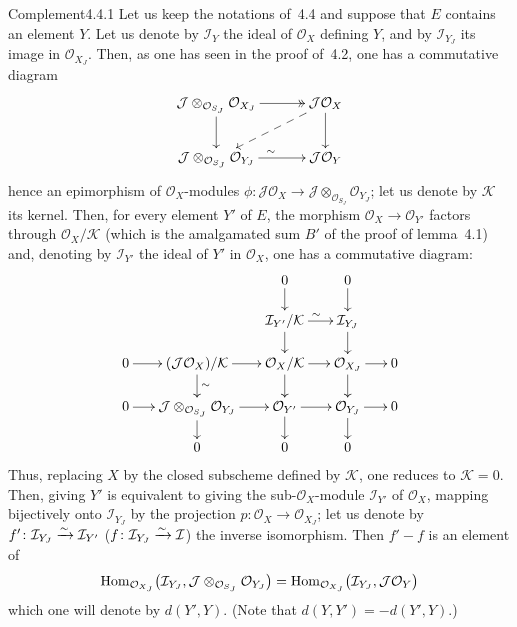\begin{enoncerm}{Complement}{4.4.1}\label{III.4.4.1}
{\renewcommand{\thefootnote}{(80)}}%
Let us keep the notations of~4.4 and suppose that \(E\) contains an element
\(Y\). Let us denote by \(\mathcal{I}_{Y}\) the ideal of \(\mathcal{O}_{X}\)
defining \(Y\), and by \(\mathcal{I}_{Y_{J}}\) its image in
\(\mathcal{O}_{X_{J}}\). Then, as one has seen in the proof of~4.2, one has
a commutative diagram
\[
\xymatrix@C=3.2em@R=2.2em{
\mathcal{J}\otimes_{\mathcal{O}_{S_{J}}}\mathcal{O}_{X_{J}}
  \ar@{->>}[r] \ar[d]
& \mathcal{J}\mathcal{O}_{X} \ar[d] \ar@{-->}[dl] \\
\mathcal{J}\otimes_{\mathcal{O}_{S_{J}}}\mathcal{O}_{Y_{J}}
  \ar[r]^{\sim}
& \mathcal{J}\mathcal{O}_{Y}
}
\]
hence an epimorphism of \(\mathcal{O}_{X}\)-modules
\(\phi\colon\mathcal{J}\mathcal{O}_{X}
  \to\mathcal{J}\otimes_{\mathcal{O}_{S_{J}}}\mathcal{O}_{Y_{J}}\);
let us denote by \(\mathcal{K}\) its kernel. Then, for every element \(Y'\)
of \(E\), the morphism \(\mathcal{O}_{X}\to\mathcal{O}_{Y'}\) factors
through \(\mathcal{O}_{X}/\mathcal{K}\) (which is the amalgamated sum \(B'\)
of the proof of lemma~4.1) and, denoting by \(\mathcal{I}_{Y'}\) the ideal
of \(Y'\) in \(\mathcal{O}_{X}\), one has a commutative diagram:
\[
\xymatrix@C=1.5em@R=1.45em{
& & 0 \ar[d] & 0 \ar[d] & \\
& & \mathcal{I}_{Y'}/\mathcal{K} \ar[r]^{\sim} \ar[d]
  & \mathcal{I}_{Y_{J}} \ar[d] & \\
0 \ar[r]
  & (\mathcal{J}\mathcal{O}_{X})/\mathcal{K} \ar[r] \ar[d]^{\sim}
  & \mathcal{O}_{X}/\mathcal{K} \ar[r] \ar[d]
  & \mathcal{O}_{X_{J}} \ar[r] \ar[d]
  & 0 \\
0 \ar[r]
  & \mathcal{J}\otimes_{\mathcal{O}_{S_{J}}}\mathcal{O}_{Y_{J}}
      \ar[r] \ar[d]
  & \mathcal{O}_{Y'} \ar[r] \ar[d]
  & \mathcal{O}_{Y_{J}} \ar[r] \ar[d]
  & 0 \\
& 0 & 0 & 0 &
}
\]
Thus, replacing \(X\) by the closed subscheme defined by \(\mathcal{K}\), one
reduces to \(\mathcal{K}=0\). Then, giving \(Y'\) is equivalent to giving
the sub-\(\mathcal{O}_{X}\)-module \(\mathcal{I}_{Y'}\) of
\(\mathcal{O}_{X}\), mapping bijectively onto \(\mathcal{I}_{Y_{J}}\) by the
projection \(p\colon\mathcal{O}_{X}\to\mathcal{O}_{X_{J}}\); let us denote
by \(f'\colon\mathcal{I}_{Y_{J}}\xrightarrow{\sim}\mathcal{I}_{Y'}\)
(\resp \(f\colon\mathcal{I}_{Y_{J}}\xrightarrow{\sim}\mathcal{I}\)) the inverse
isomorphism.%
Then \(f'-f\) is an element of
\[
\operatorname{Hom}_{\mathcal{O}_{X_{J}}}\bigl(\mathcal{I}_{Y_{J}},
  \mathcal{J}\otimes_{\mathcal{O}_{S_{J}}}\mathcal{O}_{Y_{J}}\bigr)
  =\operatorname{Hom}_{\mathcal{O}_{X_{J}}}\bigl(\mathcal{I}_{Y_{J}},
    \mathcal{J}\mathcal{O}_{Y}\bigr)
\]
which one will denote by \(d(Y',Y)\). (Note that
\(d(Y,Y')=-d(Y',Y)\).)
\end{enoncerm}
